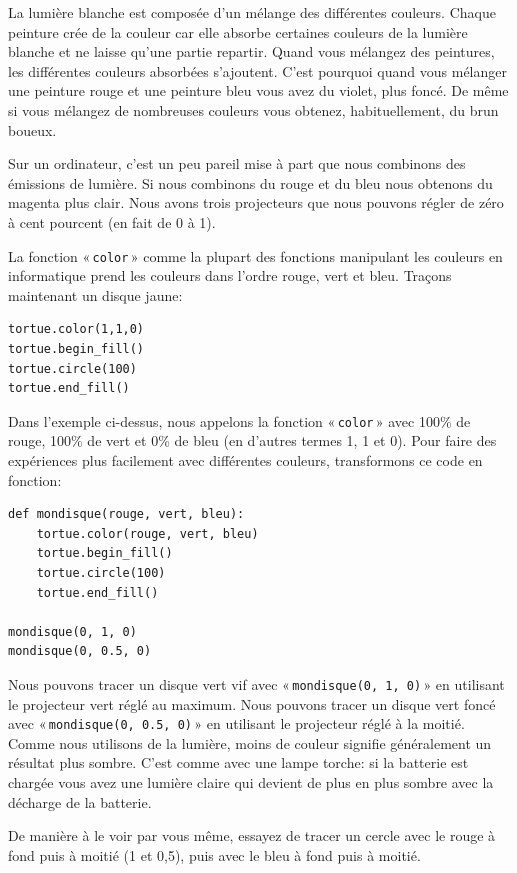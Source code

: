 La lumière blanche est composée d'un mélange des différentes couleurs.
Chaque peinture crée de la couleur car elle absorbe certaines couleurs de la lumière blanche et ne laisse qu'une partie repartir. 
Quand vous mélangez des peintures, les différentes couleurs absorbées s'ajoutent. C'est pourquoi quand vous mélanger une peinture rouge et une peinture bleu vous avez du violet, plus foncé. De même si vous mélangez de nombreuses couleurs vous obtenez, habituellement, du brun boueux.
 
Sur un ordinateur, c'est un peu pareil mise à part que nous combinons des émissions de lumière. Si nous combinons du rouge et du bleu nous obtenons du magenta plus clair.
Nous avons trois projecteurs que nous pouvons régler de zéro à cent pourcent (en fait de 0 à 1).

La fonction « \texttt{color} » comme la plupart des fonctions manipulant les couleurs en informatique prend les couleurs dans l'ordre rouge, vert et bleu. Traçons maintenant un disque jaune:

\begin{Verbatim}[frame=single,rulecolor=\color{mbleu}, label=à taper]
tortue.color(1,1,0)
tortue.begin_fill()
tortue.circle(100)
tortue.end_fill()
\end{Verbatim}

Dans l'exemple ci-dessus, nous appelons la fonction « \texttt{color} » avec 100\% de rouge, 100\% de vert et 0\% de bleu (en d'autres termes 1, 1 et 0). Pour faire des expériences plus facilement avec différentes couleurs, transformons ce code en fonction:
\begin{Verbatim}[frame=single,rulecolor=\color{mbleu}, label=à taper]
def mondisque(rouge, vert, bleu):
    tortue.color(rouge, vert, bleu)
    tortue.begin_fill()
    tortue.circle(100)
    tortue.end_fill()
    
mondisque(0, 1, 0)
mondisque(0, 0.5, 0)
\end{Verbatim}

Nous pouvons tracer un disque vert vif avec « \texttt{mondisque(0, 1, 0)} »  en utilisant le projecteur vert réglé au maximum. Nous pouvons tracer un disque vert foncé avec « \texttt{mondisque(0, 0.5, 0)} » en utilisant le projecteur réglé à la moitié. Comme nous utilisons de la lumière, moins de couleur signifie généralement un résultat plus sombre. C'est comme avec une lampe torche: si la batterie est chargée vous avez une lumière claire qui devient de plus en plus sombre avec la décharge de la batterie.

De manière à le voir par vous même, essayez de tracer un cercle avec le rouge à fond puis à moitié (1 et 0,5), puis avec le bleu à fond puis à moitié.

